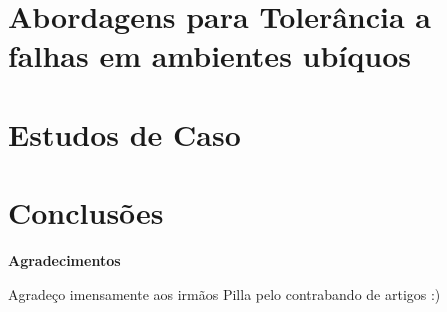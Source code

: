 \documentclass{SBCbookchapter}
\begin{document}
\section{Abordagens para Tolerância a falhas em ambientes ubíquos}
\label{sec:tolerancia}


\section{Estudos de Caso}
\label{sec:estudos}


\section{Conclusões}
\label{sec:conclusoes}


\begin{center}
	\textbf{Agradecimentos}
\end{center}
Agradeço imensamente aos irmãos Pilla pelo contrabando de artigos :)
	



\end{document}
